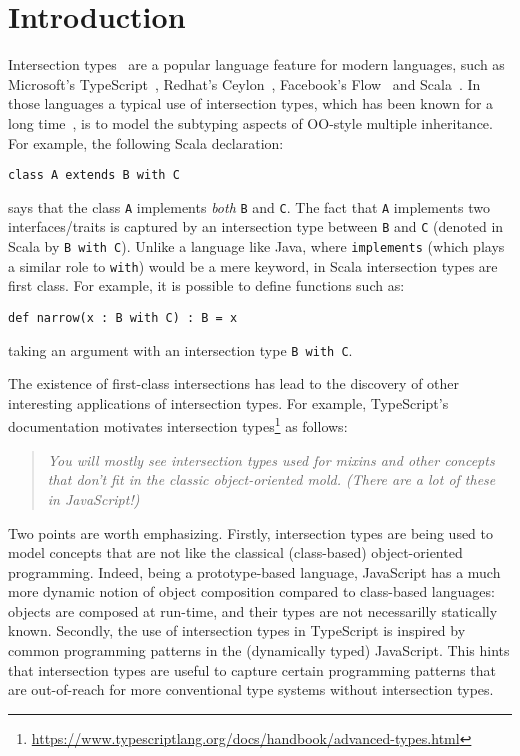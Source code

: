 \section{Introduction}
\label{sec:intro}

Intersection types~\cite{coppo1981functional,Pottinger80type} are a popular language feature for
modern languages, such as Microsoft's TypeScript~\cite{typescript}, 
Redhat's Ceylon~\cite{ceylon}, Facebook's Flow~\cite{flow} and
Scala~\cite{scala-overview}.
In those languages a typical use of intersection
types, which has been known for a long time~\cite{comppier96}, 
is to model the subtyping aspects of OO-style multiple inheritance. 
For example, the following Scala declaration:

\begin{lstlisting}
class A extends B with C
\end{lstlisting}

\noindent says that the class \lstinline{A} implements \emph{both}
\lstinline{B} and \lstinline{C}. The fact that \lstinline{A}
implements two interfaces/traits is captured by an intersection type
between \lstinline{B} and \lstinline{C} (denoted in Scala by
\lstinline{B with C}). Unlike a language like Java, where
\lstinline{implements} (which plays a similar role to
\lstinline{with}) would be a mere keyword, in Scala
intersection types are first class. For example, it is possible to define 
functions such as:

\begin{lstlisting}
def narrow(x : B with C) : B = x
\end{lstlisting}

\noindent taking an argument with an intersection
type \lstinline{B with C}. 

The existence of first-class intersections has lead to the
discovery of other interesting applications of intersection types. 
For example, TypeScript's documentation motivates intersection
types\footnote{\url{https://www.typescriptlang.org/docs/handbook/advanced-types.html}}
as follows:

\begin{quote}
\emph{You will mostly see intersection types used for mixins and other
concepts that don’t fit in the classic object-oriented mold. (There are a lot of these in JavaScript!)}
\end{quote}

\noindent Two points are worth emphasizing. Firstly, 
intersection types are being used to model concepts that are not
like the classical (class-based) object-oriented programming. Indeed, 
being a prototype-based language, JavaScript has a much more dynamic 
notion of object composition compared to class-based languages:
objects are composed at run-time, and their types are not necessarilly
statically known. Secondly, the use of intersection types in
TypeScript is inspired by common programming patterns in the
(dynamically typed) JavaScript. This hints that intersection types are 
useful to capture certain programming patterns that are out-of-reach for
more conventional type systems without intersection types.

